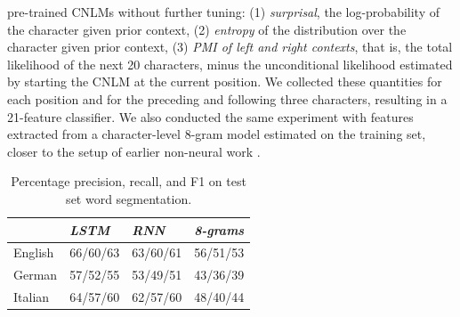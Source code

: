 pre-trained CNLMs without further tuning: (1) \emph{surprisal}, the
log-probability of the character given prior context, (2)
\emph{entropy} of the distribution over the character given prior
context, (3) \emph{PMI of left and right contexts}, that is, the total
 likelihood of the next 20 characters, minus the unconditional
 likelihood estimated by starting the CNLM at the current position. %
 We collected these quantities for each position and for the preceding
 and following three characters, resulting in a 21-feature classifier. %
We also conducted the same experiment with features extracted from a
character-level 8-gram model estimated on the training set, closer to
the setup of earlier non-neural work
\cite{saffran-word-1996, feng-accessor-2004}.


\begin{table}[t]
	\small
  \begin{center}
    \begin{tabular}{l|l|l|l}
      \multicolumn{1}{c|}{}&\emph{LSTM}&\emph{RNN}&\emph{8-grams}\\
      \hline
      English & 66/60/63 &   63/60/61 & 56/51/53    \\ %
      German &  57/52/55 &  53/49/51 & 43/36/39   \\ %
      Italian &  64/57/60 & 62/57/60  & 48/40/44    \\ %
    \end{tabular}
  \end{center}
  \caption{\label{tab:segmentation-results} Percentage precision, recall, and F1 on test set word segmentation.}
\end{table}


